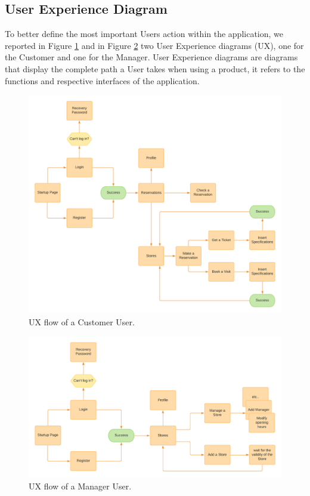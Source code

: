 \documentclass[a4paper, 12pt, oneside, table]{article}
\begin{document}
\subsection{User Experience Diagram}
To better define the most important Users action within the application, we reported in Figure \ref{customer_experience} and in Figure \ref{manager_experience} two User Experience diagrams (UX), one for the Customer and one for the Manager. User Experience diagrams are diagrams that display the complete path a User takes when using a product, it refers to the functions and respective interfaces of the application.
\begin{figure}[h!]
\centering
	\centering
  	\includegraphics[height=0.5\textheight, scale=0.2, keepaspectratio]{img/customer_experience.png} 
  	\caption{UX flow of a Customer User.}
 	\label{customer_experience}
\end{figure}
\newpage
 \begin{figure}[h!]
	\centering
  	\includegraphics[height=0.35\textheight, scale=0.2, keepaspectratio]{img/manager_experience.png}
	\caption{UX flow of a Manager User.}
 	\label{manager_experience}
\end{figure}
\end{document}
